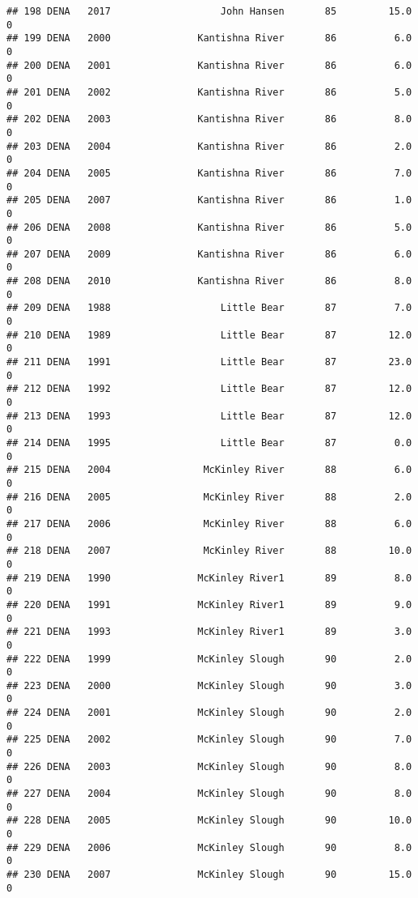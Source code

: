 \documentclass[
]{article}
\begin{document}
\begin{verbatim}
## 198 DENA   2017                   John Hansen       85         15.0       0
## 199 DENA   2000               Kantishna River       86          6.0       0
## 200 DENA   2001               Kantishna River       86          6.0       0
## 201 DENA   2002               Kantishna River       86          5.0       0
## 202 DENA   2003               Kantishna River       86          8.0       0
## 203 DENA   2004               Kantishna River       86          2.0       0
## 204 DENA   2005               Kantishna River       86          7.0       0
## 205 DENA   2007               Kantishna River       86          1.0       0
## 206 DENA   2008               Kantishna River       86          5.0       0
## 207 DENA   2009               Kantishna River       86          6.0       0
## 208 DENA   2010               Kantishna River       86          8.0       0
## 209 DENA   1988                   Little Bear       87          7.0       0
## 210 DENA   1989                   Little Bear       87         12.0       0
## 211 DENA   1991                   Little Bear       87         23.0       0
## 212 DENA   1992                   Little Bear       87         12.0       0
## 213 DENA   1993                   Little Bear       87         12.0       0
## 214 DENA   1995                   Little Bear       87          0.0       0
## 215 DENA   2004                McKinley River       88          6.0       0
## 216 DENA   2005                McKinley River       88          2.0       0
## 217 DENA   2006                McKinley River       88          6.0       0
## 218 DENA   2007                McKinley River       88         10.0       0
## 219 DENA   1990               McKinley River1       89          8.0       0
## 220 DENA   1991               McKinley River1       89          9.0       0
## 221 DENA   1993               McKinley River1       89          3.0       0
## 222 DENA   1999               McKinley Slough       90          2.0       0
## 223 DENA   2000               McKinley Slough       90          3.0       0
## 224 DENA   2001               McKinley Slough       90          2.0       0
## 225 DENA   2002               McKinley Slough       90          7.0       0
## 226 DENA   2003               McKinley Slough       90          8.0       0
## 227 DENA   2004               McKinley Slough       90          8.0       0
## 228 DENA   2005               McKinley Slough       90         10.0       0
## 229 DENA   2006               McKinley Slough       90          8.0       0
## 230 DENA   2007               McKinley Slough       90         15.0       0

\end{verbatim}
\end{document}
